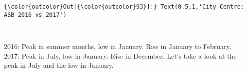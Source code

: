 \documentclass[11pt]{article}
\begin{document}
\begin{Verbatim}[commandchars=\\\{\}]
{\color{outcolor}Out[{\color{outcolor}93}]:} Text(0.5,1,'City Centre: ASB 2016 vs 2017')
\end{Verbatim}
            
    \begin{center}
    \end{center}
    { \hspace*{\fill} \\}
    
     2016: Peak in summer months, low in January. Rise in January to
February. 2017: Peak in July, low in January. Rise in December. Let's
take a look at the peak in July and the low in January. 
\end{document}
